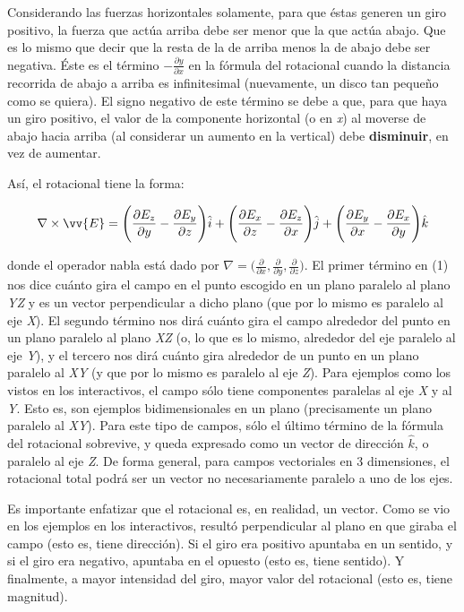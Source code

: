 \documentclass{article}
\begin{document}
Considerando las fuerzas horizontales solamente, para que éstas generen un giro positivo, la fuerza que actúa arriba debe ser menor que la que actúa abajo. Que es lo mismo que decir que la resta de la de arriba menos la de abajo debe ser negativa. Éste es el término $-\frac{\partial y}{\partial x}$ en la fórmula del rotacional cuando la distancia recorrida de abajo a arriba es infinitesimal (nuevamente, un disco tan pequeño como se quiera). El signo negativo de este término se debe a que, para que haya un giro positivo, el valor de la componente horizontal (o en \emph{x}) al moverse de abajo hacia arriba (al considerar un aumento en la vertical) debe \textbf{disminuir}, en vez de aumentar.\bigskip

Así, el rotacional tiene la forma:\bigskip

\begin{equation}
\nabla\times{\vv{E}}=\Bigg(\frac{\partial E_z}{\partial y}-\frac{\partial E_y}{\partial z}\Bigg)\hat{i}+\Bigg(\frac{\partial E_x}{\partial z}-\frac{\partial E_z}{\partial x}\Bigg)\hat{j}+\Bigg(\frac{\partial E_y}{\partial x}-\frac{\partial E_x}{\partial y}\Bigg)\hat{k}
\end{equation}\bigskip

donde el operador nabla está dado por $\nabla=\bigg(\frac{\partial}{\partial x},\frac{\partial}{\partial y},\frac{\partial}{\partial z}\bigg)$. El primer término en (1) nos dice cuánto gira el campo en el punto escogido en un plano paralelo al plano \emph{YZ} y es un vector perpendicular a dicho plano (que por lo mismo es paralelo al eje \emph{X}). El segundo término nos dirá cuánto gira el campo alrededor del punto en un plano paralelo al plano \emph{XZ} (o, lo que es lo mismo, alrededor del eje paralelo al eje \emph{Y}), y el tercero nos dirá cuánto gira alrededor de un punto en un plano paralelo al \emph{XY} (y que por lo mismo es paralelo al eje \emph{Z}). Para ejemplos como los vistos en los interactivos, el campo sólo tiene componentes paralelas al eje \emph{X} y al \emph{Y}. Esto es, son ejemplos bidimensionales en un plano (precisamente un plano paralelo al \emph{XY}). Para este tipo de campos, sólo el último término de la fórmula del rotacional sobrevive, y queda expresado como un vector de dirección $\hat{k}$, o paralelo al eje \emph{Z}. De forma general, para campos vectoriales en 3 dimensiones, el rotacional total podrá ser un vector no necesariamente paralelo a uno de los ejes.\bigskip

Es importante enfatizar que el rotacional es, en realidad, un vector. Como se vio en los ejemplos en los interactivos, resultó perpendicular al plano en que giraba el campo (esto es, tiene dirección). Si el giro era positivo apuntaba en un sentido, y si el giro era negativo, apuntaba en el opuesto (esto es, tiene sentido). Y finalmente, a mayor intensidad del giro, mayor valor del rotacional (esto es, tiene magnitud).\bigskip
\end{document}
